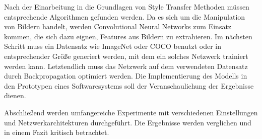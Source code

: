 Nach der Einarbeitung in die Grundlagen von Style Transfer \cite{DBLP:journals/corr/GatysEB15a, DBLP:journals/corr/JohnsonAL16} Methoden müssen entsprechende Algorithmen gefunden werden. Da es sich um die Manipulation von Bildern handelt, werden Convolutional Neural Networks \cite{lecun-gradientbased-learning-applied-1998} zum Einsatz kommen, die sich dazu eignen, Features aus Bildern zu extrahieren. Im nächsten Schritt muss ein Datensatz wie ImageNet \cite{5206848} oder COCO \cite{DBLP:journals/corr/LinMBHPRDZ14} benutzt oder in entsprechender Größe generiert werden, mit dem ein solches Netzwerk trainiert werden kann. Letztendlich muss das Netzwerk auf dem verwendeten Datensatz durch Backpropagation \cite{doi:10.1162/neco.1989.1.4.541} optimiert werden. Die Implementierung des Modells in den Prototypen eines Softwaresystems soll der Veranschaulichung der Ergebnisse dienen.

Abschließend werden umfangereiche Experimente mit verschiedenen Einstellungen und Netzwerkarchitekturen durchgeführt.
Die Ergebnisse werden verglichen und in einem Fazit kritisch betrachtet.